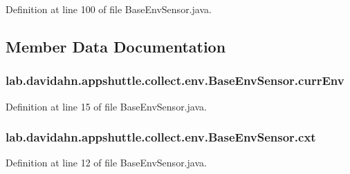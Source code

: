 \-Definition at line 100 of file \-Base\-Env\-Sensor.\-java.



\subsection{\-Member \-Data \-Documentation}
\hypertarget{classlab_1_1davidahn_1_1appshuttle_1_1collect_1_1env_1_1_base_env_sensor_a0b41eb8a97bd0fe2f2fd73bea55ceb22}{
\subsubsection[{curr\-Env}]{ {\bf lab.\-davidahn.\-appshuttle.\-collect.\-env.\-Base\-Env\-Sensor.\-curr\-Env}}}\label{classlab_1_1davidahn_1_1appshuttle_1_1collect_1_1env_1_1_base_env_sensor_a0b41eb8a97bd0fe2f2fd73bea55ceb22}


\-Definition at line 15 of file \-Base\-Env\-Sensor.\-java.

\hypertarget{classlab_1_1davidahn_1_1appshuttle_1_1collect_1_1env_1_1_base_env_sensor_ad2dbd9b532aeb77190431d4f785a3615}{
\subsubsection[{cxt}]{ {\bf lab.\-davidahn.\-appshuttle.\-collect.\-env.\-Base\-Env\-Sensor.\-cxt}}}\label{classlab_1_1davidahn_1_1appshuttle_1_1collect_1_1env_1_1_base_env_sensor_ad2dbd9b532aeb77190431d4f785a3615}


\-Definition at line 12 of file \-Base\-Env\-Sensor.\-java.

